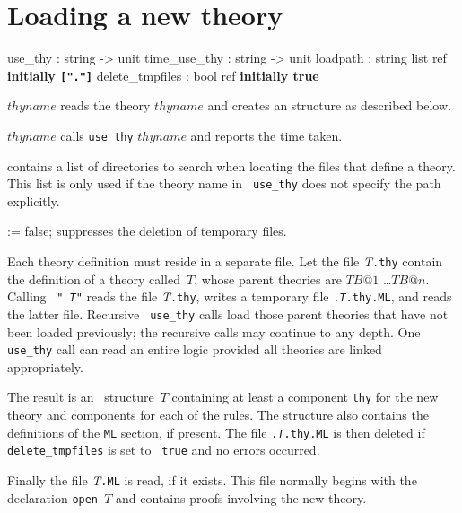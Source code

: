\section{Loading a new theory}\label{LoadingTheories}
\begin{ttbox}
use_thy         : string -> unit
time_use_thy    : string -> unit
loadpath        : string list ref \hfill{\bf initially {\tt["."]}}
delete_tmpfiles : bool ref \hfill{\bf initially true}
\end{ttbox}

\begin{ttdescription}
\item[\ttindexbold{use_thy} $thyname$]
  reads the theory $thyname$ and creates an \ML{} structure as described below.

\item[\ttindexbold{time_use_thy} $thyname$]
  calls {\tt use_thy} $thyname$ and reports the time taken.

\item[\ttindexbold{loadpath}]
  contains a list of directories to search when locating the files that
  define a theory.  This list is only used if the theory name in {\tt
    use_thy} does not specify the path explicitly.

\item[\ttindexbold{delete_tmpfiles} := false;]
suppresses the deletion of temporary files.
\end{ttdescription}
%
Each theory definition must reside in a separate file.  Let the file {\it
  T}{\tt.thy} contain the definition of a theory called~$T$, whose parent
theories are $TB@1$ \dots $TB@n$.  Calling ~{\tt"{\it
  T\/}"} reads the file {\it T}{\tt.thy}, writes a temporary \ML{}
file {\tt.{\it T}.thy.ML}, and reads the latter file.  Recursive {\tt
  use_thy} calls load those parent theories that have not been loaded
previously; the recursive calls may continue to any depth.  One {\tt use_thy}
call can read an entire logic provided all theories are linked appropriately.

The result is an \ML\ structure~$T$ containing at least a component {\tt thy}
for the new theory and components for each of the rules.  The structure also
contains the definitions of the {\tt ML} section, if present.  The file
{\tt.{\it T}.thy.ML} is then deleted if {\tt delete_tmpfiles} is set to {\tt
true} and no errors occurred.

Finally the file {\it T}{\tt.ML} is read, if it exists.  This file normally
begins with the declaration {\tt open~$T$} and contains proofs involving
the new theory.


